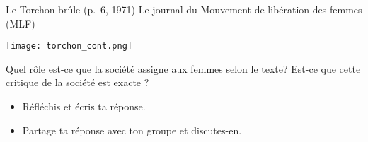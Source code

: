 \begin{frame}{Le Torchon brûle (p.~6, 1971)}
  Le journal du Mouvement de libération des femmes (MLF)

    \texttt{[image: torchon\_cont.png]}
    
  Quel rôle est-ce que la société assigne aux femmes selon le texte? Est-ce que cette critique de la société est exacte ?
  \begin{itemize}
    \item Réfléchis et écris ta réponse.
    \item Partage ta réponse avec ton groupe et discutes-en.
  \end{itemize}
\end{frame}
